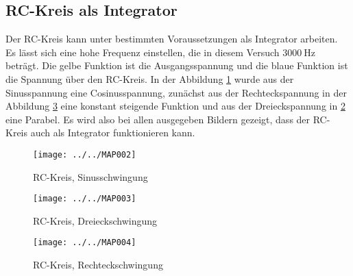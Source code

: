 \subsection{RC-Kreis als Integrator}
Der RC-Kreis kann unter bestimmten Voraussetzungen als Integrator arbeiten. Es lässt sich eine hohe Frequenz einstellen, die in diesem Versuch $\SI{3000}{\Hz}$ beträgt. Die gelbe Funktion ist die Ausgangsspannung und die blaue Funktion ist die Spannung über den RC-Kreis. 
In der Abbildung \ref{fig:map002} wurde aus der Sinusspannung eine Cosinusspannung, zunächst aus der Rechteckspannung in der Abbildung \ref{fig:map004} eine konstant steigende Funktion und aus der Dreieckspannung in \ref{fig:map003} eine Parabel. 
Es wird also bei allen ausgegeben Bildern gezeigt, dass der RC-Kreis auch als Integrator funktionieren kann.
\begin{figure}[h!]
	\centering
	\texttt{[image: ../../MAP002]}
	\caption{RC-Kreis, Sinusschwingung}
	\label{fig:map002}
\end{figure}
\begin{figure}[h!]
	\centering
	\texttt{[image: ../../MAP003]}
	\caption{RC-Kreis, Dreieckschwingung}
	\label{fig:map003}
\end{figure}
\begin{figure}[h!]
	\centering
	\texttt{[image: ../../MAP004]}
	\caption{RC-Kreis, Rechteckschwingung}
	\label{fig:map004}
\end{figure}
